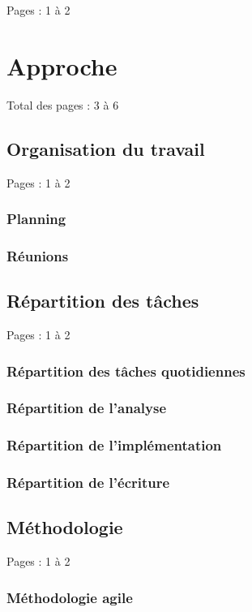\documentclass{eplmastersthesis_FR}
\begin{document}
			Pages : 1 à 2



	\chapter{Approche}

		Total des pages : 3 à 6

		\section{Organisation du travail}

			Pages : 1 à 2

			\subsection*{Planning}
			\subsection*{Réunions}

		\section{Répartition des tâches}

			Pages : 1 à 2

			\subsection*{Répartition des tâches quotidiennes}
			\subsection*{Répartition de l'analyse}
			\subsection*{Répartition de l'implémentation}
			\subsection*{Répartition de l'écriture}

		\section{Méthodologie}

			Pages : 1 à 2

			\subsection*{Méthodologie agile}
\end{document}

